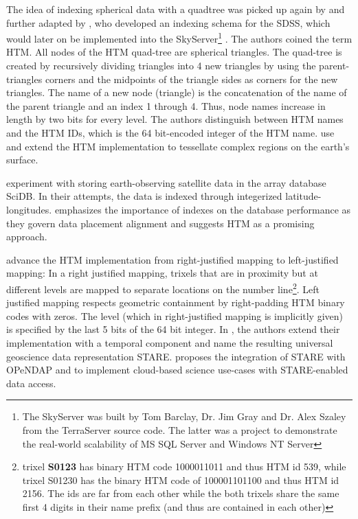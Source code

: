 \documentclass[a4paper,10pt]{article}
\begin{document}
The idea of indexing spherical data with a quadtree was picked up again by \citep{Barret1995} and further adapted by \citep{Kunszt2000, Kunszt2001, Szalay2005}, who developed an indexing schema for the \gls{SDSS}, which would later on be implemented into the SkyServer\footnote{The SkyServer was built by Tom Barclay, Dr. Jim Gray and Dr. Alex Szaley from the TerraServer \citep{Barclay1998, Slutz1999} source code. The latter was a project to demonstrate the real-world scalability of MS SQL Server and Windows NT Server} \citep{Szalay2002, Thakar2003}.
The authors coined the term \gls{HTM}.
All nodes of the HTM quad-tree are spherical triangles. The quad-tree is created by recursively dividing triangles into 4 new triangles by using the parent-triangles corners and the midpoints of the triangle sides as corners for the new triangles.
The name of a new node (triangle) is the concatenation of the name of the parent triangle and an index 1 through 4. Thus, node names increase in length by two bits for every level. The authors distinguish between HTM names and the HTM IDs, which is the 64 bit-encoded integer of the HTM name. 
\citep{Kondor2014} use and extend the HTM implementation to tessellate complex regions on the earth's surface.

\citep{Planthaber2012, Planthaber2012b, Krcal2015, Hausen2016, Doan2016} experiment with storing earth-observing satellite data in the array database SciDB. In their attempts, the data is indexed through integerized latitude-longitudes. \citep{Doan2016} emphasizes the importance of indexes on the database performance as they govern data placement alignment and suggests \gls{HTM} as a promising approach.

\citep{Rilee2016} advance the HTM implementation from right-justified mapping to left-justified mapping:
In a right justified mapping, trixels that are in proximity but at different levels are mapped to separate locations on the number line\footnote{trixel \textbf{S0123} has binary HTM code 1000011011 and thus HTM id 539, while trixel S01230 has the binary HTM code of 100001101100 and thus HTM id 2156. The ids are far from each other while the both trixels share the same first 4 digits in their name prefix (and thus are contained in each other)}.
Left justified mapping respects geometric containment by right-padding HTM binary codes with zeros.
The level (which in right-justified mapping is implicitly given) is specified by the last 5 bits of the 64 bit integer.
In \citep{Kuo2017}, the authors extend their implementation with a temporal component and name the resulting universal geoscience data representation \gls{STARE}.
\citep{Rilee2018} proposes the integration of \gls{STARE} with \gls{OPeNDAP} and to implement cloud-based science use-cases with STARE-enabled data access.
\end{document}
